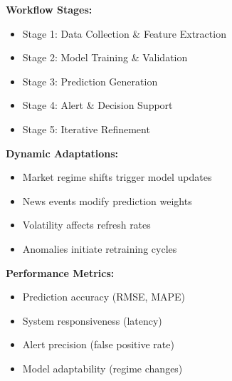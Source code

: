 \begin{table}[thb]
\begin{small}
{\begin{minipage}{0.45\textwidth}
\textbf{Workflow Stages:}
\begin{itemize}[leftmargin=1em, topsep=-.1pt, itemsep=-.1pt, label=-]
\item Stage 1: Data Collection \& Feature Extraction
\item Stage 2: Model Training \& Validation
\item Stage 3: Prediction Generation
\item Stage 4: Alert \& Decision Support
\item Stage 5: Iterative Refinement
\end{itemize}

\textbf{Dynamic Adaptations:}
\begin{itemize}[leftmargin=1em, topsep=-.1pt, itemsep=-.1pt, label=-]
\item Market regime shifts trigger model updates
\item News events modify prediction weights
\item Volatility affects refresh rates
\item Anomalies initiate retraining cycles
\end{itemize}

\textbf{Performance Metrics:}
\begin{itemize}[leftmargin=1em, topsep=-.1pt, itemsep=-.1pt, label=-]
\item Prediction accuracy (RMSE, MAPE)
\item System responsiveness (latency)
\item Alert precision (false positive rate)
\item Model adaptability (regime changes)
\end{itemize}
\end{minipage}
}
\end{small}
\label{tab:StockPrediction}
\end{table}

